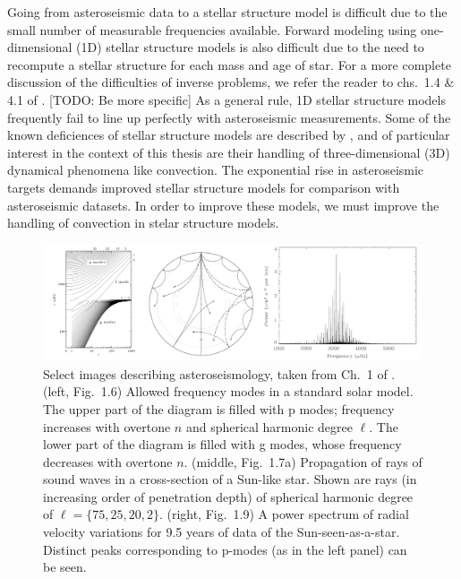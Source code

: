 Going from asteroseismic data to a stellar structure model is difficult due to the small number of measurable frequencies available.
Forward modeling using one-dimensional (1D) stellar structure models is also difficult due to the need to recompute a stellar structure for each mass and age of star.
For a more complete discussion of the difficulties of inverse problems, we refer the reader to chs.~1.4 \& 4.1 of \citet{bellingerT2018}.
[TODO: Be more specific] As a general rule, 1D stellar structure models frequently fail to line up perfectly with asteroseismic measurements.
Some of the known deficiences of stellar structure models are described by \cite{buldgen2019}, and of particular interest in the context of this thesis are their handling of three-dimensional (3D) dynamical phenomena like convection.
The exponential rise in asteroseismic targets demands improved stellar structure models for comparison with asteroseismic datasets.
In order to improve these models, we must improve the handling of convection in stelar structure models. 

\begin{figure}[ht]
\includegraphics[width=\textwidth]{./figs/intro/asteroseismology.pdf}
\caption[Solar velocity power spectra.]
{
	Select images describing asteroseismology, taken from Ch.~1 of \citet{aerts&all2010}.
	(left, Fig.~1.6) Allowed frequency modes in a standard solar model.
	The upper part of the diagram is filled with p modes; frequency increases with overtone $n$ and spherical harmonic degree $\ell$.
	The lower part of the diagram is filled with g modes, whose frequency decreases with overtone $n$.
	(middle, Fig.~1.7a) Propagation of rays of sound waves in a cross-section of a Sun-like star.
	Shown are rays (in increasing order of penetration depth) of spherical harmonic degree of $\ell = \{75, 25, 20, 2\}$.
	(right, Fig.~1.9) A power spectrum of radial velocity variations for 9.5 years of data of the Sun-seen-as-a-star.
	Distinct peaks corresponding to p-modes (as in the left panel) can be seen.
	\label{fig:asteroseismology} 
}
\end{figure}



